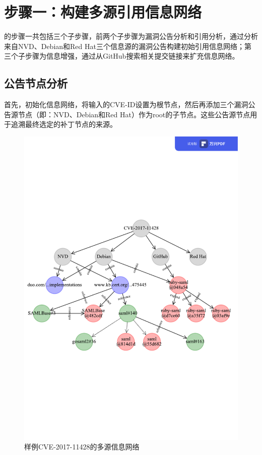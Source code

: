 \section{步骤一：构建多源引用信息网络}
\tool 的步骤一共包括三个子步骤，前两个子步骤为漏洞公告分析和引用分析，通过分析来自NVD、Debian和Red Hat三个信息源的漏洞公告构建初始引用信息网络；第三个子步骤为信息增强，通过从GitHub搜索相关提交链接来扩充信息网络。

\subsection{公告节点分析} \label{sec:advisory analysis}
首先，\tool 初始化信息网络，将输入的CVE-ID设置为根节点，然后再添加三个漏洞公告源节点（即：NVD、Debian和Red Hat）作为root的子节点。这些公告源节点用于追溯最终选定的补丁节点的来源。

\begin{figure}[h]
    \centering
    \includegraphics[scale=0.68]{res/network-example.pdf}
    \caption{样例CVE-2017-11428的多源信息网络}\label{fig:example}
\end{figure}

